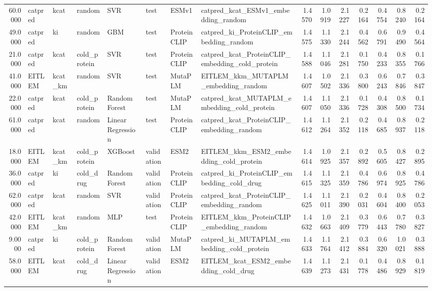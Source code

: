 \begin{tabular}{rlllllllrrrrrrr}
60.0000 & catpred & kcat & random & SVR & test & ESMv1 & catpred_kcat_ESMv1_embedding_random & 1.4570 & 1.0919 & 2.1227 & 0.2164 & 0.4754 & 0.8240 & 0.2164 \\
49.0000 & catpred & ki & random & GBM & test & ProteinCLIP & catpred_ki_ProteinCLIP_embedding_random & 1.4575 & 1.1330 & 2.1244 & 0.4562 & 0.6791 & 0.9490 & 0.4564 \\
21.0000 & catpred & kcat & cold_protein & SVR & test & ProteinCLIP & catpred_kcat_ProteinCLIP_embedding_cold_protein & 1.4588 & 1.1046 & 2.1281 & 0.1750 & 0.4233 & 0.8355 & 0.1766 \\
41.0000 & EITLEM & kcat_km & random & SVR & test & MutaPLM & EITLEM_kkm_MUTAPLM_embedding_random & 1.4607 & 1.0502 & 2.1336 & 0.3800 & 0.6243 & 0.7846 & 0.3847 \\
22.0000 & catpred & kcat & cold_protein & Random Forest & test & MutaPLM & catpred_kcat_MUTAPLM_embedding_cold_protein & 1.4607 & 1.1050 & 2.1336 & 0.1728 & 0.4308 & 0.8500 & 0.1734 \\
61.0000 & catpred & kcat & random & Linear Regression & test & ProteinCLIP & catpred_kcat_ProteinCLIP_embedding_random & 1.4612 & 1.1264 & 2.1352 & 0.2118 & 0.4685 & 0.8937 & 0.2118 \\
18.0000 & EITLEM & kcat_km & cold_protein & XGBoost & validation & ESM2 & EITLEM_kkm_ESM2_embedding_cold_protein & 1.4614 & 1.0925 & 2.1357 & 0.2892 & 0.5605 & 0.8427 & 0.2895 \\
36.0000 & catpred & ki & cold_drug & Random Forest & validation & ProteinCLIP & catpred_ki_ProteinCLIP_embedding_cold_drug & 1.4615 & 1.1325 & 2.1359 & 0.4786 & 0.6974 & 0.8925 & 0.4786 \\
62.0000 & catpred & kcat & random & SVR & validation & ProteinCLIP & catpred_kcat_ProteinCLIP_embedding_random & 1.4625 & 1.1011 & 2.1390 & 0.2031 & 0.4604 & 0.8400 & 0.2053 \\
42.0000 & EITLEM & kcat_km & random & MLP & test & ProteinCLIP & EITLEM_kkm_ProteinCLIP_embedding_random & 1.4632 & 1.0663 & 2.1409 & 0.3779 & 0.6443 & 0.7780 & 0.3827 \\
9.0000 & catpred & ki & cold_protein & Random Forest & validation & MutaPLM & catpred_ki_MUTAPLM_embedding_cold_protein & 1.4633 & 1.1764 & 2.1412 & 0.3884 & 0.6320 & 1.0021 & 0.3888 \\
58.0000 & EITLEM & kcat & cold_drug & Linear Regression & validation & ESM2 & EITLEM_kcat_ESM2_embedding_cold_drug & 1.4639 & 1.1273 & 2.1431 & 0.1778 & 0.4486 & 0.8929 & 0.1819 \\

\end{tabular}
